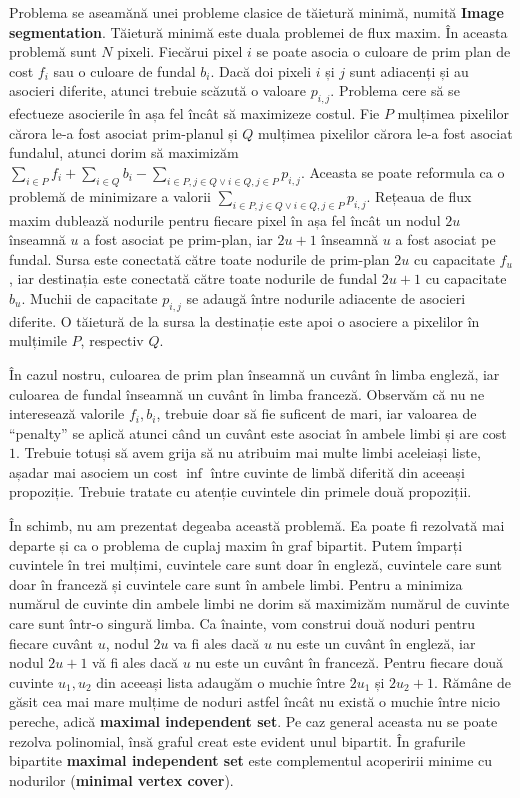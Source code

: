 Problema se aseamănă unei probleme clasice de tăietură minimă, numită \textbf{Image segmentation}. Tăietură minimă este duala
problemei de flux maxim. În aceasta problemă sunt $N$ pixeli. Fiecărui pixel $i$ se poate asocia o culoare de prim plan de cost
$f_{i}$ sau o culoare de fundal $b_{i}$. Dacă doi pixeli $i$ și $j$ sunt adiacenți și au asocieri diferite, atunci trebuie scăzută
o valoare $p_{i,j}$. Problema cere să se efectueze asocierile în așa fel încât să maximizeze costul. Fie $P$ mulțimea pixelilor cărora
le-a fost asociat prim-planul și $Q$ mulțimea pixelilor cărora le-a fost asociat fundalul, atunci dorim să maximizăm
$\displaystyle\sum\limits_{i \in P} f_{i} + \displaystyle\sum\limits_{i \in Q} b_{i} - \displaystyle\sum\limits_{i \in P, j \in Q \lor i \in Q, j \in P} p_{i,j}$. Aceasta se poate reformula ca o problemă
de minimizare a valorii $\displaystyle\sum\limits_{i \in P, j \in Q \lor i \in Q, j \in P} p_{i,j}$. Rețeaua de flux maxim dublează nodurile pentru fiecare pixel
în așa fel încât un nodul $2u$ înseamnă $u$ a fost asociat pe prim-plan, iar $2u+1$ înseamnă $u$ a fost asociat pe fundal. Sursa este
conectată către toate nodurile de prim-plan $2u$ cu capacitate $f_{u}$, iar destinația este conectată către toate nodurile de fundal $2u+1$
cu capacitate $b_{u}$. Muchii de capacitate $p_{i,j}$ se adaugă între nodurile adiacente de asocieri diferite. O tăietură de la sursa la
destinație este apoi o asociere a pixelilor în mulțimile $P$, respectiv $Q$.

În cazul nostru, culoarea de prim plan înseamnă un cuvânt în limba engleză, iar culoarea de fundal înseamnă un cuvânt în limba franceză.
Observăm că nu ne interesează valorile $f_{i}, b_{i}$, trebuie doar să fie suficent de mari, iar valoarea de ``penalty'' se aplică atunci când
un cuvânt este asociat în ambele limbi și are cost $1$. Trebuie totuși să avem grija să nu atribuim mai multe limbi aceleiași liste, așadar mai
asociem un cost $\inf$ între cuvinte de limbă diferită din aceeași propoziție. Trebuie tratate cu atenție cuvintele din primele două propoziții.

În schimb, nu am prezentat degeaba această problemă. Ea poate fi rezolvată mai departe și ca o problema de cuplaj maxim în graf bipartit.
Putem împarți cuvintele în trei mulțimi, cuvintele care sunt doar în engleză, cuvintele care sunt doar în franceză și cuvintele
care sunt în ambele limbi. Pentru a minimiza numărul de cuvinte din ambele limbi ne dorim să maximizăm numărul de cuvinte care sunt într-o
singură limba. Ca înainte, vom construi două noduri pentru fiecare cuvânt $u$, nodul $2u$ va fi ales dacă $u$ nu este un cuvânt în engleză,
iar nodul $2u + 1$ vă fi ales dacă $u$ nu este un cuvânt în franceză. Pentru fiecare două cuvinte $u_{1}, u_{2}$ din aceeași lista adaugăm o
muchie între $2u_{1}$ și $2u_{2} + 1$. Rămâne de găsit cea mai mare mulțime de noduri astfel încât nu există o muchie între nicio pereche, adică
\textbf{maximal independent set}. Pe caz general aceasta nu se poate rezolva polinomial, însă graful creat este evident unul bipartit. În grafurile
bipartite \textbf{maximal independent set} este complementul acoperirii minime cu nodurilor (\textbf{minimal vertex cover}).

